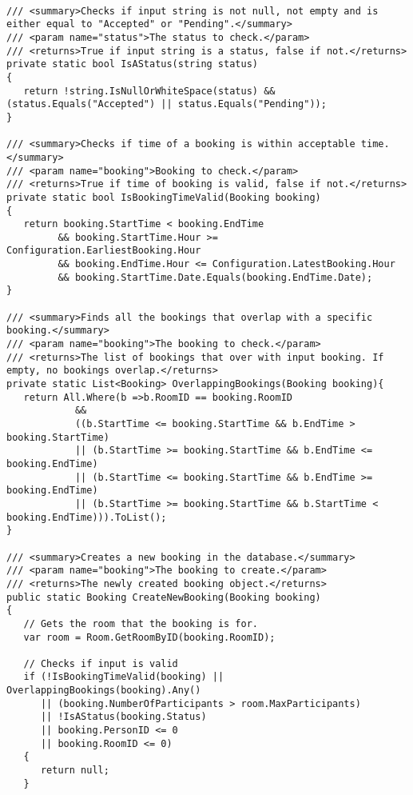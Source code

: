 \begin{lstlisting}[caption= Logik til oprettelse af booking]

/// <summary>Checks if input string is not null, not empty and is either equal to "Accepted" or "Pending".</summary>
/// <param name="status">The status to check.</param>
/// <returns>True if input string is a status, false if not.</returns>
private static bool IsAStatus(string status)
{
   return !string.IsNullOrWhiteSpace(status) && (status.Equals("Accepted") || status.Equals("Pending"));
}

/// <summary>Checks if time of a booking is within acceptable time.</summary>
/// <param name="booking">Booking to check.</param>
/// <returns>True if time of booking is valid, false if not.</returns>
private static bool IsBookingTimeValid(Booking booking)
{
   return booking.StartTime < booking.EndTime
         && booking.StartTime.Hour >= Configuration.EarliestBooking.Hour
         && booking.EndTime.Hour <= Configuration.LatestBooking.Hour
         && booking.StartTime.Date.Equals(booking.EndTime.Date);
}

/// <summary>Finds all the bookings that overlap with a specific booking.</summary>
/// <param name="booking">The booking to check.</param>
/// <returns>The list of bookings that over with input booking. If empty, no bookings overlap.</returns>
private static List<Booking> OverlappingBookings(Booking booking){
   return All.Where(b =>b.RoomID == booking.RoomID
            &&
            ((b.StartTime <= booking.StartTime && b.EndTime > booking.StartTime) 
            || (b.StartTime >= booking.StartTime && b.EndTime <= booking.EndTime)
            || (b.StartTime <= booking.StartTime && b.EndTime >= booking.EndTime) 
            || (b.StartTime >= booking.StartTime && b.StartTime < booking.EndTime))).ToList();
}

/// <summary>Creates a new booking in the database.</summary>
/// <param name="booking">The booking to create.</param>
/// <returns>The newly created booking object.</returns>
public static Booking CreateNewBooking(Booking booking)
{
   // Gets the room that the booking is for.
   var room = Room.GetRoomByID(booking.RoomID);

   // Checks if input is valid
   if (!IsBookingTimeValid(booking) || OverlappingBookings(booking).Any()
      || (booking.NumberOfParticipants > room.MaxParticipants)
      || !IsAStatus(booking.Status)
      || booking.PersonID <= 0
      || booking.RoomID <= 0)
   {
      return null;
   }


\end{lstlisting}

